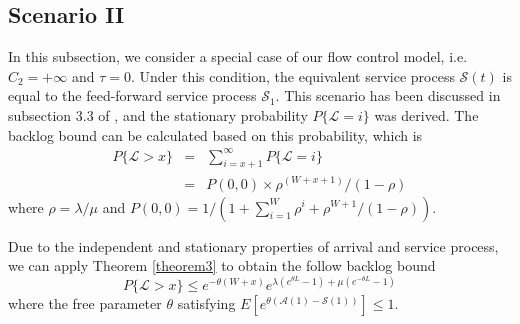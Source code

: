 \documentclass[12pt]{article}
\begin{document}
\subsection{Scenario II}\label{scenario2}
In this subsection, we consider a special case of our flow control model, i.e. $C_2=+\infty$ and $\tau=0$. Under this condition, the equivalent service process $\mathcal{S}(t)$ is equal to the feed-forward service process $\mathcal{S}_1$. This scenario has been discussed in subsection 3.3 of \cite{jung1996analysis}, and the stationary probability $P\{\mathcal{L}=i\}$ was derived. The backlog bound can be calculated based on this probability, which is
\begin{eqnarray}\label{oldresult}
P\{\mathcal{L}>x\}&=&\sum_{i=x+1}^\infty P\{\mathcal{L}=i\}\nonumber\\
&=& P(0,0)\times\rho^{(W+x+1)}/(1-\rho)
\end{eqnarray}
where $\rho=\lambda/\mu$ and $P(0,0)=1/(1+\sum_{i=1}^W\rho^i+\rho^{W+1}/(1-\rho))$.

Due to the independent and stationary properties of arrival and service process, we can apply Theorem \ref{theorem3} to obtain the follow backlog bound
\begin{equation}\label{newresult}
P\{\mathcal{L}>x\}\leq e^{-\theta(W+x)}e^{\lambda(e^{\theta L}-1)+\mu(e^{-\theta L}-1)}
\end{equation}
where the free parameter $\theta$ satisfying $E[e^{\theta(\mathcal{A}(1)-\mathcal{S}(1))}]\leq 1$.
\end{document}
